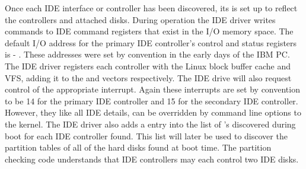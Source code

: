 Once each IDE interface or controller has been discovered, its  is set up to reflect the
controllers and attached disks.
During operation the IDE driver writes commands to IDE command registers that exist in the I/O memory space.
The default I/O address for the primary IDE controller's control and status registers is  - .
These addresses were set by convention in the early days of the IBM PC.
The IDE driver registers each controller with the Linux block buffer cache and VFS, adding it to the 
 and  vectors respectively.
The IDE drive will also request control of the appropriate interrupt.
Again these interrupts are set by convention to be 14 for the primary IDE controller and 15 for the secondary 
IDE controller.
However, they like all IDE details, can be overridden by command  line options to the kernel.
The IDE driver also adds a  entry into the list of 's discovered during boot for
each IDE controller found.
This list will later be used to discover the partition tables of all of the hard disks found at boot time.
The partition checking code understands that IDE controllers may each control two IDE disks.

